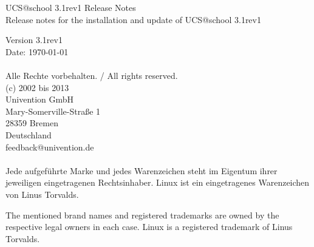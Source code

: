 


\newcommand{\ucsManualTitle}{UCS@school 3.1rev1 Release Notes}
\newcommand{\ucsManualSubtitle}{Release notes for the installation and update of UCS@school 3.1rev1}
\newcommand{\ucsManualVersion}{3.1rev1}
\newcommand{\ucsTechAuthor}{ & Univention GmbH & feedback@univention.de}

\setcounter{secnumdepth}{3}
\setcounter{tocdepth}{3}


\begin{titlepage}
  \thispagestyle{empty}

  \vspace*{3cm}
  \sffamily \bfseries
  \begin{center}
    \Huge
      \ucsManualTitle \\ [3.5cm]
    \huge
      \ucsManualSubtitle
  \end{center}
  \normalsize
  \normalfont

\newpage
\AddToShipoutPicture{\ifthenelse{\isodd{\thepage}}%
        {\BackgroundPicOdd}{\BackgroundPicEven}}
\thispagestyle{empty}
\parindent0cm
\sffamily
\vspace*{12cm}

Version \ucsManualVersion \\
Date: \today \\
\\
Alle Rechte vorbehalten. / All rights reserved.\\
(c) 2002 bis 2013 \\
Univention GmbH \\
Mary-Somerville-Straße 1 \\
28359 Bremen \\
Deutschland \\
feedback@univention.de \\
\\
Jede aufgeführte Marke und jedes Warenzeichen steht im Eigentum ihrer
jeweiligen eingetragenen Rechtsinhaber. Linux ist ein eingetragenes
Warenzeichen von Linus Torvalds.

The mentioned brand names and registered trademarks are owned by the
respective legal owners in each case. Linux is a registered trademark
of Linus Torvalds.

\end{titlepage}


